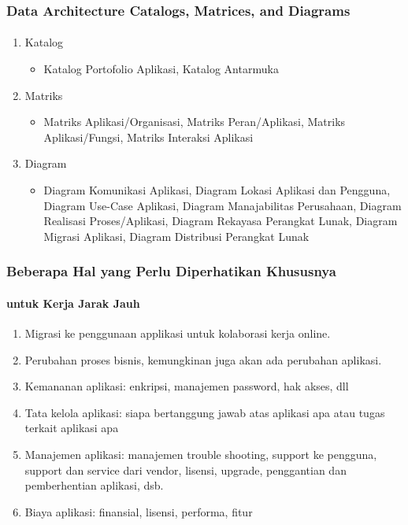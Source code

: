\documentclass[aspectratio=169, table]{beamer}
\begin{document}
\begin{frame}
	\frametitle{Data Architecture Catalogs, Matrices, and Diagrams}
	\framesubtitle{\hspace{1cm}}
	\begin{enumerate}
		\item Katalog
		\begin{itemize}
			\item Katalog Portofolio Aplikasi, Katalog Antarmuka
		\end{itemize}
		\item Matriks
		\begin{itemize}
			\item Matriks Aplikasi/Organisasi, Matriks Peran/Aplikasi, Matriks Aplikasi/Fungsi, Matriks Interaksi Aplikasi
		\end{itemize}
		\item Diagram
		\begin{itemize}
			\item Diagram Komunikasi Aplikasi, Diagram Lokasi Aplikasi dan Pengguna, Diagram Use-Case Aplikasi, Diagram Manajabilitas Perusahaan, Diagram Realisasi Proses/Aplikasi, Diagram Rekayasa Perangkat Lunak, Diagram Migrasi Aplikasi, Diagram Distribusi Perangkat Lunak
		\end{itemize}
	\end{enumerate}
\end{frame}


\begin{frame}
	\frametitle{Beberapa Hal yang Perlu Diperhatikan Khususnya}
    \framesubtitle{untuk Kerja Jarak Jauh}
	\begin{enumerate}
		\item Migrasi ke penggunaan applikasi untuk kolaborasi kerja online.
		\item Perubahan proses bisnis, kemungkinan juga akan ada perubahan aplikasi.
		\item Kemananan aplikasi: enkripsi, manajemen password, hak akses, dll
		\item Tata kelola aplikasi: siapa bertanggung jawab atas aplikasi apa atau tugas terkait aplikasi apa
		\item Manajemen aplikasi: manajemen trouble shooting, support ke pengguna, support dan service dari vendor, lisensi, upgrade, penggantian dan pemberhentian aplikasi, dsb.
		\item Biaya aplikasi: finansial, lisensi, performa, fitur
	\end{enumerate}
\end{frame}
\end{document}
